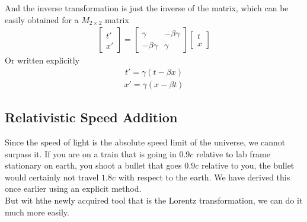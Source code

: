 \documentclass[11pt,letterpaper]{book}
\begin{document}
And the inverse transformation is just the inverse of the matrix, which can be easily obtained for a $M_{2 \times 2}$ matrix
\begin{align}
\begin{bmatrix}
    t' \\ x'
\end{bmatrix}
=
\begin{bmatrix}
    \gamma      &   -\beta\gamma   \\
    -\beta\gamma &   \gamma
\end{bmatrix}
\begin{bmatrix}
    t\\ x
\end{bmatrix}
\end{align}
Or written explicitly
\begin{align}
t' = \gamma(t-\beta x)
\end{align}
\begin{align}
x' = \gamma (x-\beta t)
\end{align}
\subsection{Relativistic Speed Addition}
Since the speed of light is the absolute speed limit of the universe, we cannot surpass it. If you are on a train that is going in $0.9c$ relative to lab frame stationary on earth, you shoot a bullet that goes $0.9c$ relative to you, the bullet would certainly not travel $1.8c$ with respect to the earth. We have derived this once earlier using an explicit method.\\

But wit hthe newly acquired tool that is the Lorentz transformation, we can do it much more easily.\\
\end{document}

